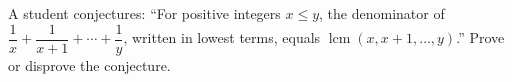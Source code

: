 A student conjectures: ``For positive integers $x\le y$, the denominator of $\dfrac{1}{x}+\dfrac{1}{x+1}+\cdots+\dfrac{1}{y}$, written in lowest terms, equals $\operatorname{lcm}(x,x+1,\dots,y)$.'' Prove or disprove the conjecture.
